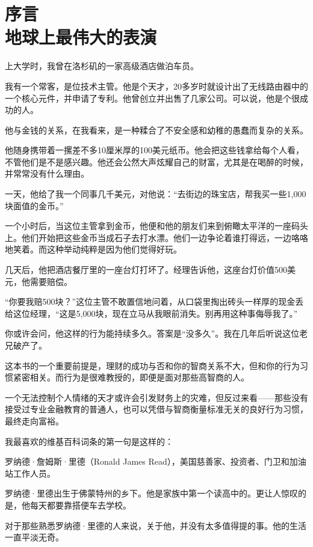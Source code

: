\section[序言\q 地球上最伟大的表演]{序言\\ 地球上最伟大的表演}

上大学时，我曾在洛杉矶的一家高级酒店做泊车员。

我有一个常客，是位技术主管。他是个天才，20多岁时就设计出了无线路由器中的一个核心元件，并申请了专利。他曾创立并出售了几家公司。可以说，他是个很成功的人。

他与金钱的关系，在我看来，是一种糅合了不安全感和幼稚的愚蠢而复杂的关系。

他随身携带着一摞差不多10厘米厚的100美元纸币。他会把这些钱拿给每个人看，不管他们是不是感兴趣。他还会公然大声炫耀自己的财富，尤其是在喝醉的时候，并常常没有什么理由。

一天，他给了我一个同事几千美元，对他说：“去街边的珠宝店，帮我买一些1,000块面值的金币。”

一个小时后，当这位主管拿到金币，他便和他的朋友们来到俯瞰太平洋的一座码头上。他们开始把这些金币当成石子去打水漂。他们一边争论着谁打得远，一边咯咯地笑着。而这种举动纯粹是因为他们觉得好玩。

几天后，他把酒店餐厅里的一座台灯打坏了。经理告诉他，这座台灯价值500美元，他需要赔偿。

“你要我赔500块？”这位主管不敢置信地问着，从口袋里掏出砖头一样厚的现金丢给这位经理，“这是5,000块，现在立马从我眼前消失。别再用这种事侮辱我了。”

你或许会问，他这样的行为能持续多久。答案是“没多久”。我在几年后听说这位老兄破产了。

这本书的一个重要前提是，理财的成功与否和你的智商关系不大，但和你的行为习惯紧密相关。而行为是很难教授的，即便是面对那些高智商的人。

一个无法控制个人情绪的天才或许会引发财务上的灾难，但反过来看——那些没有接受过专业金融教育的普通人，也可以凭借与智商衡量标准无关的良好行为习惯，最终走向富裕。

我最喜欢的维基百科词条的第一句是这样的：

{\kaishu

罗纳德·詹姆斯·里德（Ronald James Read），美国慈善家、投资者、门卫和加油站工作人员。

}

罗纳德·里德出生于佛蒙特州的乡下。他是家族中第一个读高中的。更让人惊叹的是，他每天都要靠搭便车去学校。

对于那些熟悉罗纳德·里德的人来说，关于他，并没有太多值得提的事。他的生活一直平淡无奇。

